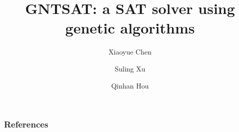 \documentclass{beamer}
\title[GNTSAT]{GNTSAT: a SAT solver using genetic algorithms}
\author[Chen, Xu, Hou]{
	Xiaoyue Chen \and Suling Xu \and Qinhan Hou
}
\institute[UU]{Uppsala University}
\begin{document}
\frame{\titlepage}






\begin{frame}
\frametitle{References}
\printbibliography
\end{frame}
\end{document}
